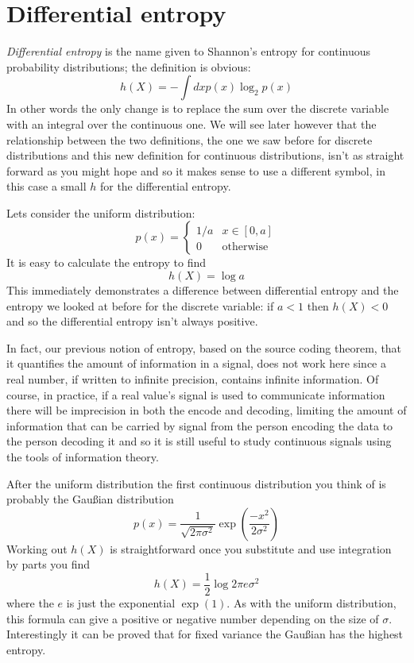 \documentclass[12pt]{article}
\begin{document}
\section*{Differential entropy} 

\textsl{Differential entropy} is the name given to Shannon's entropy for continuous probability distributions; the definition is obvious:
\begin{equation}
  h(X)=-\int dx p(x)\log_2{p(x)}
\end{equation}
In other words the only change is to replace the sum over the discrete
variable with an integral over the continuous one. We will see later
however that the relationship between the two definitions, the one we
saw before for discrete distributions and this new definition for
continuous distributions, isn't as straight forward as you might hope
and so it makes sense to use a different symbol, in this case a small
$h$ for the differential entropy.

Lets consider the uniform distribution:
\begin{equation}
  p(x)=\left\{\begin{array}{ll}1/a&x\in [0,a]\\0&\mbox{otherwise}\end{array}\right.
\end{equation}
It is easy to calculate the entropy to find
\begin{equation}
  h(X)=\log{a}
\end{equation}
This immediately demonstrates a difference between differential
entropy and the entropy we looked at before for the discrete variable:
if $a<1$ then $h(X)<0$ and so the differential entropy isn't always
positive.

In fact, our previous notion of entropy, based on the source coding
theorem, that it quantifies the amount of information in a signal,
does not work here since a real number, if written to infinite
precision, contains infinite information. Of course, in practice, if a
real value's signal is used to communicate information there will be
imprecision in both the encode and decoding, limiting the amount of
information that can be carried by signal from the person encoding the
data to the person decoding it and so it is still useful to study
continuous signals using the tools of information theory.

After the uniform distribution the first continuous distribution you
think of is probably the Gau{\ss}ian distribution
\begin{equation}
  p(x)=\frac{1}{\sqrt{2\pi \sigma^2}}\exp\left(\frac{-x^2}{2\sigma^2}\right)
\end{equation}
Working out $h(X)$ is straightforward once you substitute and use integration by parts you find
\begin{equation}
  h(X)=\frac{1}{2}\log{2\pi e \sigma^2}
\end{equation}
where the $e$ is just the exponential $\exp{(1)}$. As with the uniform
distribution, this formula can give a positive or negative number
depending on the size of $\sigma$. Interestingly it can be proved that
for fixed variance the Gau{\ss}ian has the highest entropy.
\end{document}
